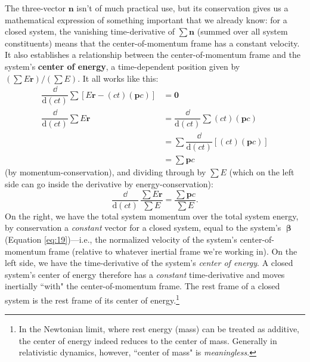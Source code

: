 \documentclass[12pt]{article}
\renewcommand{\vv}[1]{\mathbf{#1}}
\newcommand{\dd}[1]{\mathrm{d}#1}
\newcommand{\vvbeta}{\bm{\upbeta}}
\begin{document}
The three-vector $\vv n$ isn't of much practical use, but its conservation gives us a mathematical expression of something important that we already know: for a closed system, the vanishing time-derivative of $\sum \vv n$ (summed over all system constituents) means that the center-of-momentum frame has a constant velocity. It also establishes a relationship between the center-of-momentum frame and the system's \textbf{center of energy}, a time-dependent position given by $(\sum E \vv r)/(\sum E)$. It all works like this:
\begin{equation*}
\begin{split}
\dfrac{\dd}{\dd (ct)} \sum \left[ E \vv r -  \left( ct \right) \left( \vv p c \right) \right] &= \vv 0 \\
\dfrac{\dd}{\dd (ct)} \sum E \vv r &= \dfrac{\dd}{\dd (ct)} \sum \left( ct \right) \left( \vv p c \right) \\
&=  \sum \dfrac{\dd}{\dd (ct)} \left[ \left( ct \right) \left( \vv p c \right) \right] \\
&=  \sum \vv p c
\end{split}
\end{equation*}
(by momentum-conservation), and dividing through by $\sum E$ (which on the left side can go inside the derivative by energy-conservation):
\begin{equation*}
\dfrac{\dd}{\dd (ct)} \, \dfrac{ \sum E \vv r }{\sum E} =  \dfrac{\sum \vv p c}{\sum E}.
\end{equation*}
On the right, we have the total system momentum over the total system energy, by conservation a \emph{constant} vector for a closed system, equal to the system's $\vvbeta$ (Equation \ref{eq:19})---i.e., the normalized velocity of the system's center-of-momentum frame (relative to whatever inertial frame we're working in). On the left side, we have the time-derivative of the system's \emph{center of energy}. A closed system's center of energy therefore has a \emph{constant} time-derivative and moves inertially ``with" the center-of-momentum frame. The rest frame of a closed system is the rest frame of its center of energy.\footnote{In the Newtonian limit, where rest energy (mass) can be treated as additive, the center of energy indeed reduces to the center of mass. Generally in relativistic dynamics, however, ``center of mass" is \emph{meaningless}.}
\end{document}

